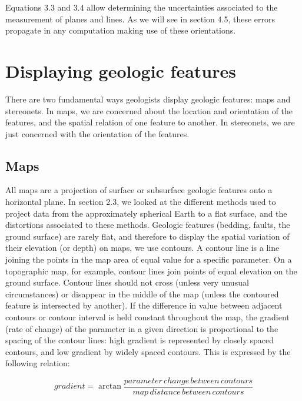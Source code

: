 \documentclass[a4paper , 12pt]{book}
\begin{document}
Equations 3.3 and 3.4 allow determining the uncertainties associated to the measurement of planes and lines. As we will see in section 4.5, these errors propagate in any computation making use of these orientations.

\section{Displaying geologic features}

There are two fundamental ways geologists display geologic features: maps and stereonets. In maps, we are concerned about the location and orientation of the features, and the spatial relation of one feature to another. In stereonets, we are just concerned with the orientation of the features.

\subsection{Maps}

All maps are a projection of surface or subsurface geologic features onto a horizontal plane. In section 2.3, we looked at the different methods used to project data from the approximately spherical Earth to a flat surface, and the distortions associated to these methods. Geologic features (bedding, faults, the ground surface) are rarely flat, and therefore to display the spatial variation of their elevation (or depth) on maps, we use contours. A contour line is a line joining the points in the map area of equal value for a specific parameter. On a topographic map, for example, contour lines join points of equal elevation on the ground surface. Contour lines should not cross (unless very unusual circumstances) or disappear in the middle of the map (unless the contoured feature is intersected by another). If the difference in value between adjacent contours or contour interval is held constant throughout the map, the gradient (rate of change) of the parameter in a given direction is proportional to the spacing of the contour lines: high gradient is represented by closely spaced contours, and low gradient by widely spaced contours. This is expressed by the following relation:

\begin{equation}
    gradient = \arctan\frac{parameter\,change\,between\,contours}{map\,distance\,between\,contours} \tag{3.5a}
\end{equation}
\end{document}
